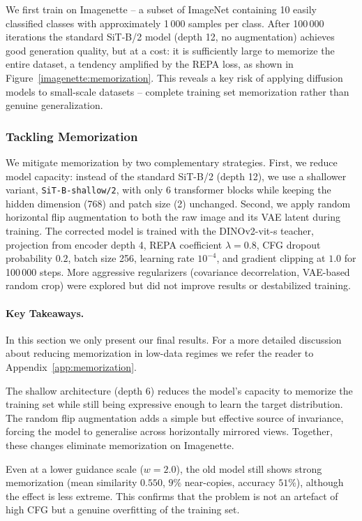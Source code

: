 We first train on Imagenette -- a subset of ImageNet containing 10 easily classified
classes with approximately 1\,000 samples per class. After 100\,000 iterations the
standard SiT-B/2 model (depth 12, no augmentation) achieves good generation quality,
but at a cost: it is sufficiently large to memorize the entire dataset, a tendency
amplified by the REPA loss, as shown in Figure~\ref{imagenette:memorization}. This
reveals a key risk of applying diffusion models to small-scale datasets -- complete
training set memorization rather than genuine generalization.

\subsubsection{Tackling Memorization}

We mitigate memorization by two complementary strategies. First, we reduce model
capacity: instead of the standard SiT-B/2 (depth 12), we use a shallower variant,
\texttt{SiT-B-shallow/2}, with only 6 transformer blocks while keeping the hidden
dimension (768) and patch size (2) unchanged. Second, we apply random horizontal
flip augmentation to both the raw image and its VAE latent during training. The
corrected model is trained with the DINOv2-vit-s teacher, projection from encoder
depth 4, REPA coefficient $\lambda=0.8$, CFG dropout probability $0.2$, batch size
256, learning rate $10^{-4}$, and gradient clipping at $1.0$ for 100\,000 steps. More
aggressive regularizers (covariance decorrelation, VAE-based random crop) were
explored but did not improve results or destabilized training.

\paragraph{Key Takeaways.} In this section we only present our final results. For
a more detailed discussion about reducing memorization in low-data regimes
we refer the reader to Appendix~\ref{app:memorization}.

The shallow architecture (depth 6) reduces the model's capacity to memorize
the training set while still being expressive enough to learn the target
distribution. The random flip augmentation adds a simple but effective source
of invariance, forcing the model to generalise across horizontally mirrored
views. Together, these changes eliminate memorization on Imagenette.

Even at a lower guidance scale ($w=2.0$), the old model still
shows strong memorization (mean similarity $0.550$, $9\%$ near-copies, accuracy
$51\%$), although the effect is less extreme. This confirms that the problem
is not an artefact of high CFG but a genuine overfitting of the training set.

